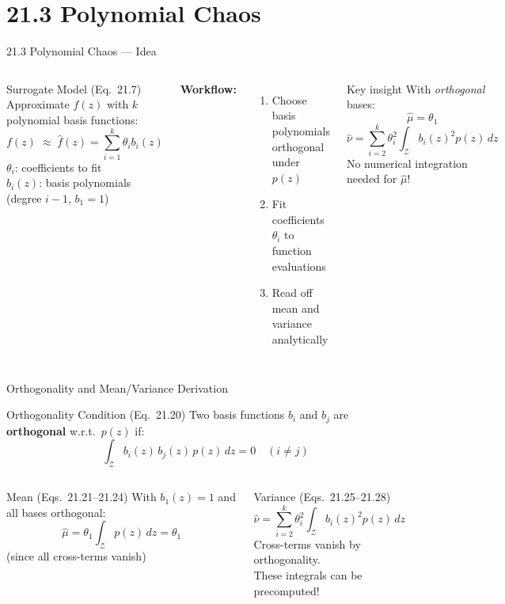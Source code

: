 \documentclass[aspectratio=169,10pt]{beamer}
\newcommand{\hmu}{\hat{\mu}}
\newcommand{\hnu}{\hat{\nu}}
\newcommand{\hf}{\hat{f}}
\begin{document}
\section{21.3 Polynomial Chaos}

\begin{frame}{21.3 Polynomial Chaos --- Idea}
  \begin{columns}[T]
      \begin{block}{Surrogate Model (Eq.\ 21.7)}
        Approximate $f(z)$ with $k$ polynomial basis functions:
        \[
          f(z) \;\approx\; \hf(z) = \sum_{i=1}^{k}\theta_i b_i(z)
        \]
        $\theta_i$: coefficients to fit\\
        $b_i(z)$: basis polynomials (degree $i-1$, $b_1=1$)
      \end{block}
      \medskip
      \textbf{Workflow:}
      \begin{enumerate}
        \item Choose basis polynomials orthogonal under $p(z)$
        \item Fit coefficients $\theta_i$ to function evaluations
        \item Read off mean and variance analytically
      \end{enumerate}
      \begin{alertblock}{Key insight}
        With \emph{orthogonal} bases:
        \[
          \hmu = \theta_1
        \]
        \[
          \hnu = \sum_{i=2}^{k}\theta_i^2
                 \int_{\mathcal{Z}} b_i(z)^2 p(z)\,dz
        \]
        No numerical integration needed for $\hmu$!
      \end{alertblock}
  \end{columns}
\end{frame}

\begin{frame}{Orthogonality and Mean/Variance Derivation}
  \begin{block}{Orthogonality Condition (Eq.\ 21.20)}
    Two basis functions $b_i$ and $b_j$ are \textbf{orthogonal} w.r.t.\ $p(z)$ if:
    \[
      \int_{\mathcal{Z}} b_i(z)\,b_j(z)\,p(z)\,dz = 0 \quad (i\ne j)
    \]
  \end{block}
  \begin{columns}[T]
      \begin{block}{Mean (Eqs.\ 21.21--21.24)}
        With $b_1(z)=1$ and all bases orthogonal:
        \[
          \hmu = \theta_1 \int_{\mathcal{Z}} p(z)\,dz = \theta_1
        \]
        (since all cross-terms vanish)
      \end{block}
      \begin{block}{Variance (Eqs.\ 21.25--21.28)}
        \[
          \hnu = \sum_{i=2}^{k}\theta_i^2 \int_{\mathcal{Z}} b_i(z)^2 p(z)\,dz
        \]
        Cross-terms vanish by orthogonality.\\
        These integrals can be precomputed!
      \end{block}
  \end{columns}
\end{frame}
\end{document}
